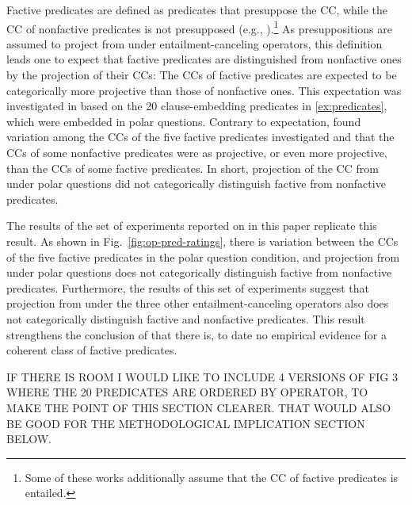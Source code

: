 \documentclass[a4paper,12pt,twoside]{article}
\begin{document}
Factive predicates are defined as predicates that presuppose the CC, while the CC of nonfactive predicates is not presupposed (e.g., \citealt{kiparsky_fact_1970,karttunen_observations_1971,schlenker_local_2010,abrusan_predicting_2011}).\footnote{Some of these works additionally assume that the CC of factive predicates is entailed.} As presuppositions are assumed to project from under entailment-canceling operators, this definition leads one to expect that factive predicates are distinguished from nonfactive ones by the projection of their CCs: The CCs of factive predicates are expected to be categorically more projective than those of nonfactive ones. This expectation was investigated in \citealt{degen_are_2022} based on the 20 clause-embedding predicates in \ref{ex:predicates}, which were embedded in polar questions. Contrary to expectation,  \citealt{degen_are_2022} found variation among the CCs of the five factive predicates investigated and that the CCs of some nonfactive predicates were as projective, or even more projective, than the CCs of some factive predicates.  In short, projection of the CC from under polar questions did not categorically distinguish factive from nonfactive predicates.

The results of the set of experiments reported on in this paper replicate this result. As shown in Fig.~\ref{fig:op-pred-ratings}, there is variation between the CCs of the five factive predicates in the polar question condition, and projection from under polar questions does not categorically distinguish factive from nonfactive predicates. Furthermore, the results of  this set of experiments suggest that projection from under the three other entailment-canceling operators also does not categorically distinguish factive and nonfactive predicates. This result strengthens the conclusion of \citealt{degen_are_2022} that there is, to date no empirical evidence for a coherent class of factive predicates.

IF THERE IS ROOM I WOULD LIKE TO INCLUDE 4 VERSIONS OF FIG 3 WHERE THE 20 PREDICATES ARE ORDERED BY OPERATOR, TO MAKE THE POINT OF THIS SECTION CLEARER. THAT WOULD ALSO BE GOOD FOR THE METHODOLOGICAL IMPLICATION SECTION BELOW.
\end{document}
